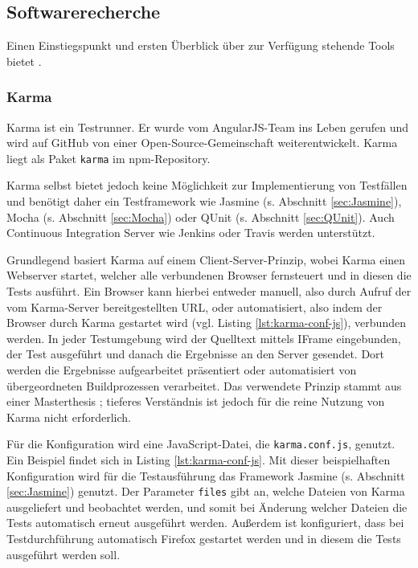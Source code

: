 \subsection{Softwarerecherche}
Einen Einstiegspunkt und ersten Überblick über zur Verfügung stehende Tools bietet \cite{unittest-overview}.

\subsubsection{Karma}
\label{sec:Karma}
Karma ist ein Testrunner. Er wurde vom AngularJS-Team ins Leben gerufen und wird auf GitHub von einer Open-Source-Gemeinschaft weiterentwickelt.\cite{karma-index} Karma liegt als Paket \texttt{karma} im npm-Repository\cite{karma-faq}.

Karma selbst bietet jedoch keine Möglichkeit zur Implementierung von Testfällen und benötigt daher ein Testframework wie Jasmine (s. Abschnitt \ref{sec:Jasmine}), Mocha (s. Abschnitt \ref{sec:Mocha}) oder QUnit (s. Abschnitt \ref{sec:QUnit}). Auch Continuous Integration Server wie Jenkins oder Travis werden unterstützt.\cite{karma-faq}

Grundlegend basiert Karma auf einem Client-Server-Prinzip, wobei Karma einen Webserver startet, welcher alle verbundenen Browser fernsteuert und in diesen die Tests ausführt. Ein Browser kann hierbei entweder manuell, also durch Aufruf der vom Karma-Server bereitgestellten URL, oder automatisiert, also indem der Browser durch Karma gestartet wird (vgl. Listing \ref{lst:karma-conf-js}), verbunden werden. In jeder Testumgebung wird der Quelltext mittels IFrame eingebunden, der Test ausgeführt und danach die Ergebnisse an den Server gesendet. Dort werden die Ergebnisse aufgearbeitet präsentiert oder automatisiert von übergeordneten Buildprozessen verarbeitet. Das verwendete Prinzip stammt aus einer Masterthesis \cite{karma-masterThesis}; tieferes Verständnis ist jedoch für die reine Nutzung von Karma nicht erforderlich.\cite{karma-howItWorks}

Für die Konfiguration wird eine JavaScript-Datei, die \texttt{karma.conf.js}, genutzt. Ein Beispiel findet sich in Listing \ref{lst:karma-conf-js}. Mit dieser beispielhaften Konfiguration wird für die Testausführung das Framework Jasmine (s. Abschnitt \ref{sec:Jasmine}) genutzt. Der Parameter \texttt{files} gibt an, welche Dateien von Karma ausgeliefert und beobachtet werden, und somit bei Änderung welcher Dateien die Tests automatisch erneut ausgeführt werden. Außerdem ist konfiguriert, dass bei Testdurchführung automatisch Firefox gestartet werden und in diesem die Tests ausgeführt werden soll.\cite{karma-configurationFile, karma-files}

